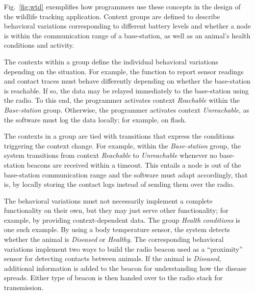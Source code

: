 Fig.~\ref{fig:wtd} exemplifies how programmers use these concepts in
the design of the wildlife tracking application. Context groups are
defined to describe behavioral variations corresponding to different
battery levels and whether a node is within the communication range of
a base-station, as well as an animal's health conditions and
activity. %

The contexts within a group define the individual behavioral
variations depending on the situation. For example, the function to
report sensor readings and contact traces must behave differently
depending on whether the base-station is reachable.  If so, the data
may be relayed immediately to the base-station using the radio. To
this end, the programmer activates context \emph{Reachable} within the
\emph{Base-station} group. Otherwise, the programmer activates context
\emph{Unreachable}, as the software must log the data locally; for
example, on flash. 

The contexts in a group are tied with transitions that express the
conditions triggering the context change. For example, within the
\emph{Base-station} group, the system transitions from context
\emph{Reachable} to \emph{Unreachable} whenever no base-station
beacons are received within a timeout. This entails a node is out of
the base-station communication range and the software must adapt
accordingly, that is, by locally storing the contact logs instead of
sending them over the radio.


The behavioral variations must not necessarily implement a complete
functionality on their own, but they may just serve other
functionality; for example, by providing context-dependent data. The
group \emph{Health conditions} is one such example. By using a body
temperature sensor, the system detects whether the animal is
\emph{Diseased} or \emph{Healthy}. The corresponding behavioral
variations implement two ways to build the radio beacon used as a
``proximity'' sensor for detecting contacts between animals. If the animal
is \emph{Diseased}, additional information is added to the beacon for
understanding how the disease spreads. Either type of beacon is then
handed over to the radio stack for transmission.

